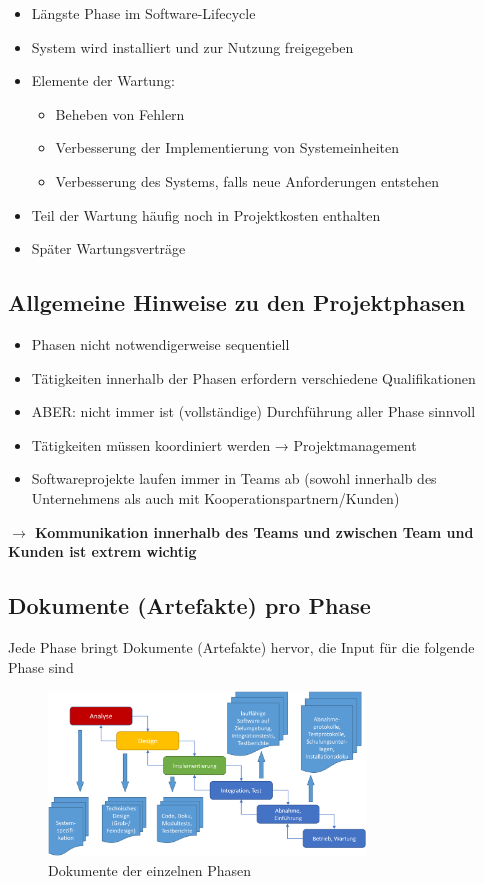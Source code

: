\documentclass[11pt, a4paper]{article}
\begin{document}
\begin{itemize}
    \item Längste Phase im Software-Lifecycle
    \item System wird installiert und zur Nutzung freigegeben
    \item Elemente der Wartung:
    \begin{itemize}
        \item Beheben von Fehlern
        \item Verbesserung der Implementierung von Systemeinheiten
        \item Verbesserung des Systems, falls neue Anforderungen entstehen
    \end{itemize}
    \item Teil der Wartung häufig noch in Projektkosten enthalten
    \item Später Wartungsverträge
\end{itemize}

\subsection{Allgemeine Hinweise zu den Projektphasen}

\begin{itemize}
    \item Phasen nicht notwendigerweise sequentiell
    \item Tätigkeiten innerhalb der Phasen erfordern verschiedene Qualifikationen
    \item ABER: nicht immer ist (vollständige) Durchführung aller Phase sinnvoll
    \item Tätigkeiten müssen koordiniert werden → Projektmanagement
    \item Softwareprojekte laufen immer in Teams ab (sowohl innerhalb des Unternehmens als auch mit Kooperationspartnern/Kunden)
\end{itemize}

\textbf{$ \rightarrow $ Kommunikation innerhalb des Teams und zwischen Team und Kunden ist extrem wichtig}

\subsection{Dokumente (Artefakte) pro Phase}

Jede Phase bringt Dokumente (Artefakte) hervor, die Input für die folgende Phase sind

\begin{figure}[h]
    \centering
    \includegraphics[width=0.75\textwidth]{Projektphasen-02}
    \caption{Dokumente der einzelnen Phasen}
    \label{fig:Projektphasen-02}
\end{figure}
\end{document}
